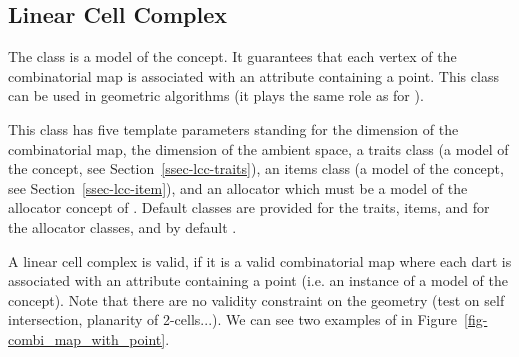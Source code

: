\subsection{Linear Cell Complex}\label{ssec-linear-cell-complex}

The  class
is a model of the  concept. It guarantees that
each vertex of the combinatorial map is associated with an attribute
containing a point. This class can be used in geometric algorithms (it
plays the same role as  for ).

This class has five template parameters standing for the dimension of
the combinatorial map, the dimension of the ambient space, a traits
class (a model of the  concept, see
Section~\ref{ssec-lcc-traits}), an items class (a model of the
 concept, see
Section~\ref{ssec-lcc-item}), and an allocator which must be a model
of the allocator concept of {\stl}.  Default classes are provided for
the traits, items, and for the allocator classes, and by default
.

A linear cell complex is valid, if it is a valid combinatorial map
where each dart is associated with an attribute containing a point
(i.e.  an instance of a model of the 
concept).  Note that there are no validity constraint on the geometry
(test on self intersection, planarity of 2-cells...).
We can see two examples of  in
Figure~\ref{fig-combi_map_with_point}.

